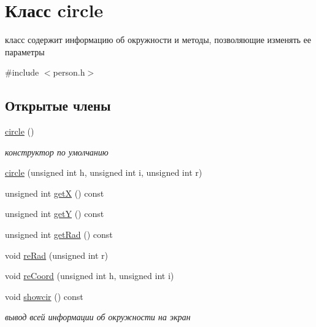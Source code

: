 \hypertarget{classcircle}{\section{Класс circle}
\label{classcircle}
}


класс содержит информацию об окружности и методы, позволяющие изменять ее параметры  




{\ttfamily \#include $<$person.\-h$>$}

\subsection*{Открытые члены}
\begin{DoxyCompactItemize}
\item 
\hyperlink{classcircle_a4e0786fc75051f3bbe5de2e08ef9712d}{circle} ()
\begin{DoxyCompactList}\small\item\em конструктор по умолчанию \end{DoxyCompactList}\item 
\hyperlink{classcircle_ab01e334fbdc01bad4f219ecee424795d}{circle} (unsigned int h, unsigned int i, unsigned int r)
\item 
unsigned int \hyperlink{classcircle_acb03d8b165cd8119e0db27e3d1f25973}{get\-X} () const 
\item 
unsigned int \hyperlink{classcircle_ac9a1cb1a59361d4c8aa2cfe97be9cd6b}{get\-Y} () const 
\item 
unsigned int \hyperlink{classcircle_a86f4fa52100c12e29c81a0d4cebcf47d}{get\-Rad} () const 
\item 
void \hyperlink{classcircle_a667301d843f0a0edfc92d32a43826ca7}{re\-Rad} (unsigned int r)
\item 
void \hyperlink{classcircle_a98edcf827c503e0259996abe32cb257e}{re\-Coord} (unsigned int h, unsigned int i)
\item 
void \hyperlink{classcircle_a41ac1ebe6a840fb68ea20ab9bb57be57}{showcir} () const 
\begin{DoxyCompactList}\small\item\em вывод всей информации об окружности на экран \end{DoxyCompactList}\end{DoxyCompactItemize}

